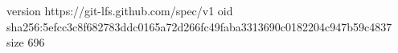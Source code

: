 version https://git-lfs.github.com/spec/v1
oid sha256:5efcc3c8f682783ddc0165a72d266fc49faba3313690c0182204c947b59c4837
size 696
